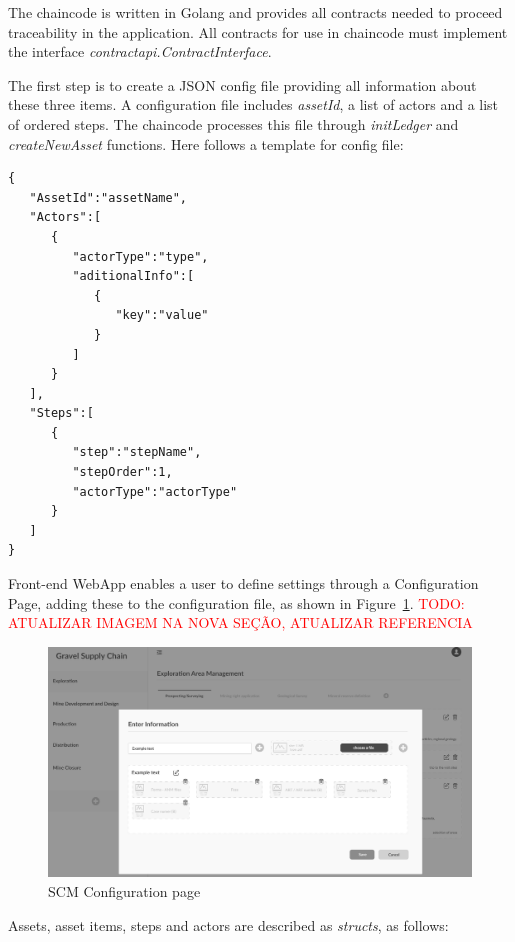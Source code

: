 The chaincode is written in Golang and provides all contracts needed to proceed traceability in the application. All contracts for use in chaincode must implement the interface \textit{contractapi.ContractInterface}. 

The first step is to create a JSON config file providing all information about these three items. A configuration file includes \textit{assetId}, a list of actors and a list of ordered steps. The chaincode processes this file through  \textit{initLedger} and \textit{createNewAsset} functions. Here follows a template for config file:  

\begin{lstlisting}
{
   "AssetId":"assetName",
   "Actors":[
      {
         "actorType":"type",
         "aditionalInfo":[
            {
               "key":"value"
            }
         ]
      }
   ],
   "Steps":[
      {
         "step":"stepName",
         "stepOrder":1,
         "actorType":"actorType"
      }
   ]
}
\end{lstlisting}

Front-end WebApp enables a user to define settings through a Configuration Page, adding these to the configuration file, as shown in Figure~\ref{fig:frontend02}.
\textcolor{red}{TODO: ATUALIZAR IMAGEM NA NOVA SEÇÃO, ATUALIZAR REFERENCIA}

\begin{figure}[ht]
\begin{center}
  \includegraphics[scale=0.265]{images/frontend02.png}
\caption{SCM Configuration page}
\label{fig:frontend02}
\end{center}
\end{figure}

Assets, asset items, steps and actors are described as \textit{structs}, as follows:

